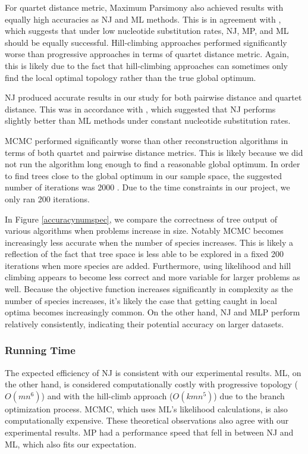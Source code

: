 \documentclass[10pt,twocolumn]{article}
\begin{document}
For quartet distance metric, Maximum Parsimony also achieved results with equally high accuracies as NJ and ML methods. This is in agreement with \cite{kuhner1994simulation}, which suggests that under low nucleotide substitution rates, NJ, MP, and ML should be equally successful. 
Hill-climbing approaches performed significantly worse than progressive approaches in terms of quartet distance metric. Again, this is likely due to the fact that hill-climbing approaches can sometimes only find the local optimal topology rather than the true global optimum.

NJ produced accurate results in our study for both pairwise distance and quartet distance. This was in accordance with \cite{saitou1989relative}, which suggested that NJ performs slightly better than ML methods under constant nucleotide substitution rates.

MCMC performed significantly worse than other reconstruction algorithms in terms of both quartet and pairwise distance metrics. This is likely because we did not run the algorithm long enough to find a reasonable global optimum. In order to find trees close to the global optimum in our sample space, the suggested number of iterations was 2000 \cite{larget1999markov}. Due to the time constraints in our project, we only ran 200 iterations.

In Figure \ref{accuracynumspec}, we compare the correctness of tree output of various algorithms when problems increase in size. Notably MCMC becomes increasingly less accurate when the number of species increases. This is likely a reflection of the fact that tree space is less able to be explored in a fixed 200 iterations when more species are added. Furthermore, using likelihood and hill climbing appears to become less correct and more variable for larger problems as well. Because the objective function increases significantly in complexity as the number of species increases, it's likely the case that getting caught in local optima becomes increasingly common. On the other hand, NJ and MLP perform relatively consistently, indicating their potential accuracy on larger datasets.

\subsubsection*{Running Time}
The expected efficiency of NJ is consistent with our experimental results. ML, on the other hand, is considered computationally costly with progressive topology ($O(mn^6)$) and with the hill-climb approach ($O(kmn^5)$) due to the branch optimization process. MCMC, which uses ML's likelihood calculations, is also computationally expensive. These theoretical observations also agree with our experimental results. MP had a performance speed that fell in between NJ and ML, which also fits our expectation.
\end{document}
